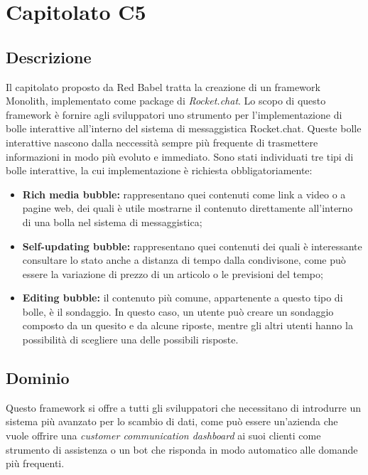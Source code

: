 \newpage
\section{Capitolato C5}

\subsection{Descrizione}

Il capitolato proposto da Red Babel tratta la creazione di un framework Monolith, implementato come package di \textit{Rocket.chat}. Lo scopo di questo
framework è fornire agli sviluppatori uno strumento per l'implementazione di bolle interattive all'interno del sistema di messaggistica Rocket.chat.
Queste bolle interattive nascono dalla neccessità sempre più frequente di trasmettere informazioni in modo più evoluto e immediato.
Sono stati individuati tre tipi di bolle interattive, la cui implementazione è richiesta obbligatoriamente:

\begin{itemize}
	\item \textbf{Rich media bubble:} rappresentano quei contenuti come link a video
	o a pagine web, dei quali è utile mostrarne il contenuto direttamente all'interno di una bolla nel sistema di messaggistica;
	\item \textbf{Self-updating bubble:} rappresentano quei contenuti dei quali è interessante
	consultare lo stato anche a distanza di tempo dalla condivisone, come
	può essere la variazione di prezzo di un articolo o le previsioni del tempo;
	\item \textbf{Editing bubble:} il contenuto più comune, appartenente a questo tipo di bolle, è il sondaggio. In questo caso, un utente può creare un sondaggio
	composto da un quesito e da alcune riposte, mentre gli altri utenti hanno la possibilità di scegliere una delle possibili risposte.
\end{itemize}


\subsection{Dominio}

Questo framework si offre a tutti gli sviluppatori che necessitano di introdurre un sistema più avanzato per lo scambio di dati, come può essere un'azienda che vuole offrire una \textit{customer communication dashboard} ai suoi clienti come strumento di assistenza o un bot che risponda in modo automatico alle domande più frequenti. 

